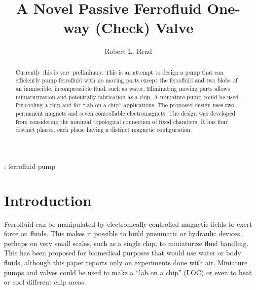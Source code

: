 \documentclass[12pt]{article}
\begin{document}

\title{A Novel Passive Ferrofluid One-way (Check) Valve}


\author{Robert L. Read}

\begin{abstract}

  Currently this is very preliminary. This is an attempt to design a pump that can efficiently pump ferrofluid with no moving parts
  except the ferrofluid and two blobs of an immiscible, incompressible fluid, such as water.
  Eliminating moving parts allows miniaturization and potentially fabrication as a chip.
  A miniature pump could be used for cooling a chip and for ``lab on a chip'' applications.
  The proposed design uses two permanent magnets and seven controllable electromagnets.
  The design was developed from considering the minimal topological connection of fixed chambers.
  It has four distinct phases, each phase having a distinct magnetic configuration.
\end{abstract}

%
\vspace{2pc}
: ferrofluid pump

%
%


\section{Introduction}

Ferrofluid can be manipulated by electronically controlled magnetic
fields to exert force on fluids\cite{torres2014recent,kole2021engineering,ozbey2015modeling}.
This makes it possible to build pneumatic or hydraulic
devices, perhaps on very small scales,
such as a single chip\cite{yamahata2003ferrofluid,hatch2001ferrofluidic}, to
miniaturize fluid handling.
This has been proposed for biomedical purposes\cite{michelson2019novel}
that would use water or body fluids,
although this paper reports only on experiments done with air.
Miniature pumps and valves could be used to make a “lab on a chip” (LOC) or
even to heat or cool different chip areas.
\end{document}
